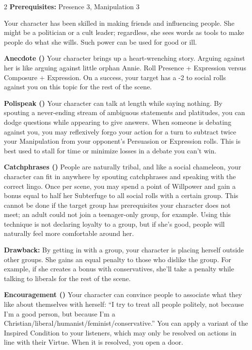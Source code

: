 \begin{multicols}{2}
\textbf{Prerequisites:} Presence 3, Manipulation 3

Your character has been skilled in making friends and influencing people. She might be a politician or a cult leader; regardless, she sees words as tools to make people do what she wills. Such power can be used for good or ill.

\textbf{Anecdote (\textbullet)} Your character brings up a heart-wrenching story. Arguing against her is like arguing against little orphan Annie. Roll Presence + Expression versus Composure + Expression. On a success, your target has a -2 to social rolls against you on this topic for the rest of the scene.

\textbf{Polispeak (\textbullet\textbullet)} Your character can talk at length while saying nothing. By spouting a never-ending stream of ambiguous statements and platitudes, you can dodge questions while appearing to give answers. When someone is debating against you, you may reflexively forgo your action for a turn to subtract twice your Manipulation from your opponent's Persuasion or Expression rolls. This is best used to stall for time or minimize losses in a debate you can't win.

\textbf{Catchphrases (\textbullet\textbullet\textbullet)} People are naturally tribal, and like a social chameleon, your character can fit in anywhere by spouting catchphrases and speaking with the correct lingo. Once per scene, you may spend a point of Willpower and gain a bonus equal to half her Subterfuge to all social rolls with a certain group. This cannot be done if the target group has prerequisites your character does not meet; an adult could not join a teenager-only group, for example. Using this technique is not declaring loyalty to a group, but if she's good, people will naturally feel more comfortable around her.

\textbf{Drawback:} By getting in with a group, your character is placing herself outside other groups. She gains an equal penalty to those who dislike the group. For example, if she creates a bonus with conservatives, she'll take a penalty while talking to liberals for the rest of the scene. 

\textbf{Encouragement (\textbullet\textbullet\textbullet\textbullet)} Your character can convince people to associate what they like about themselves with herself: “I try to treat all people politely, not because I'm a good person, but because I'm a Christian/liberal/humanist/feminist/conservative.” You can apply a variant of the Inspired Condition to your listeners, which may only be resolved on actions in line with their Virtue. When it is resolved, you open a door.


\end{multicols}
